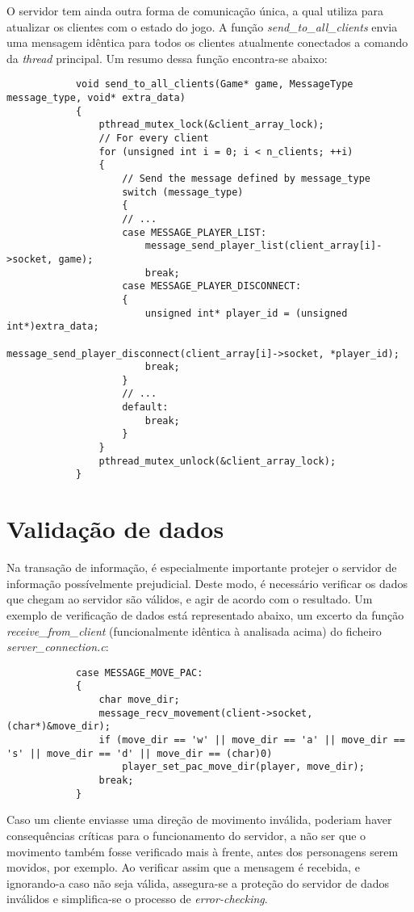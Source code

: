 \documentclass[a4paper]{report}
\begin{document}
        \par O servidor tem ainda outra forma de comunicação única, a qual utiliza para atualizar os clientes com o estado do jogo. A função \textit{send\_to\_all\_clients} envia uma mensagem idêntica para todos os clientes atualmente conectados a comando da \textit{thread} principal. Um resumo dessa função encontra-se abaixo:
        \begin{lstlisting}
            void send_to_all_clients(Game* game, MessageType message_type, void* extra_data)
            {
                pthread_mutex_lock(&client_array_lock);
                // For every client
                for (unsigned int i = 0; i < n_clients; ++i)
                {
                    // Send the message defined by message_type
                    switch (message_type)
                    {
                    // ...
                    case MESSAGE_PLAYER_LIST:
                        message_send_player_list(client_array[i]->socket, game);
                        break;
                    case MESSAGE_PLAYER_DISCONNECT:
                    {
                        unsigned int* player_id = (unsigned int*)extra_data;
                        message_send_player_disconnect(client_array[i]->socket, *player_id);
                        break;
                    }
                    // ...
                    default:
                        break;
                    }
                }
                pthread_mutex_unlock(&client_array_lock);
            }
        \end{lstlisting}

    \section{Validação de dados}
        \par Na transação de informação, é especialmente importante protejer o servidor de informação possívelmente prejudicial. Deste modo, é necessário verificar os dados que chegam ao servidor são válidos, e agir de acordo com o resultado. Um exemplo de verificação de dados está representado abaixo, um excerto da função \textit{receive\_from\_client} (funcionalmente idêntica à analisada acima) do ficheiro \textit{server\_connection.c}:
        \begin{lstlisting}
            case MESSAGE_MOVE_PAC:
            {
                char move_dir;
                message_recv_movement(client->socket, (char*)&move_dir);
                if (move_dir == 'w' || move_dir == 'a' || move_dir == 's' || move_dir == 'd' || move_dir == (char)0)
                    player_set_pac_move_dir(player, move_dir);
                break;
            }
        \end{lstlisting}
        \par Caso um cliente enviasse uma direção de movimento inválida, poderiam haver consequências críticas para o funcionamento do servidor, a não ser que o movimento também fosse verificado mais à frente, antes dos personagens serem movidos, por exemplo. Ao verificar assim que a mensagem é recebida, e ignorando-a caso não seja válida, assegura-se a proteção do servidor de dados inválidos e simplifica-se o processo de \textit{error-checking}.
\end{document}
